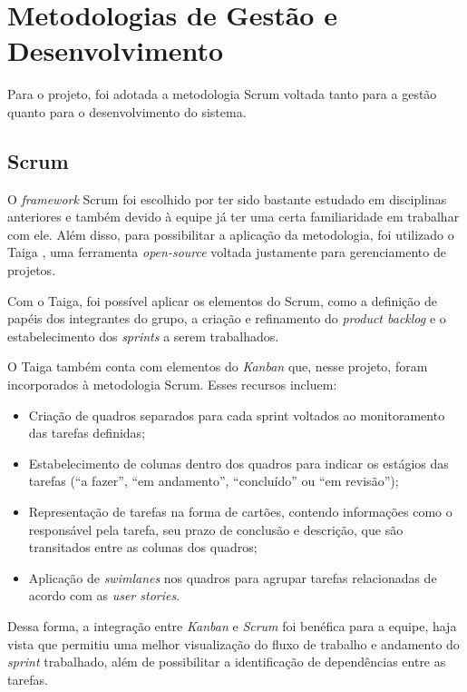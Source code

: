 \section{Metodologias de Gestão e Desenvolvimento}

\label{section:metolodogia-gestao}

Para o projeto, foi adotada a metodologia Scrum \cite{scrum-2024} voltada tanto para a gestão quanto para o desenvolvimento do sistema.

\subsection{Scrum}

O \textit{framework} Scrum foi escolhido por ter sido bastante estudado em disciplinas anteriores e também devido à equipe já ter uma certa familiaridade em trabalhar com ele. Além disso, para possibilitar a aplicação da metodologia, foi utilizado o Taiga \cite{taiga-2025}, uma ferramenta \textit{open-source} voltada justamente para gerenciamento de projetos.

Com o Taiga, foi possível aplicar os elementos do Scrum, como a definição de papéis dos integrantes do grupo, a criação e refinamento do \textit{product backlog} e o estabelecimento dos \textit{sprints} a serem trabalhados.

O Taiga também conta com elementos do \emph{Kanban} \cite{kanban-2023} que, nesse projeto, foram incorporados à metodologia Scrum. Esses recursos incluem:

\begin{itemize}
	\item Criação de quadros separados para cada sprint voltados ao monitoramento das tarefas definidas;
	\item Estabelecimento de colunas dentro dos quadros para indicar os estágios das tarefas (“a fazer”, “em andamento”, “concluído” ou “em revisão”);
	\item Representação de tarefas na forma de cartões, contendo informações como o responsável pela tarefa, seu prazo de conclusão e descrição, que são transitados entre as colunas dos quadros;
	\item Aplicação de \textit{swimlanes} nos quadros para agrupar tarefas relacionadas de acordo com as \textit{user stories}.
\end{itemize}

Dessa forma, a integração entre \emph{Kanban} e \emph{Scrum} foi benéfica para a equipe, haja vista que permitiu uma melhor visualização do fluxo de trabalho e andamento do \textit{sprint} trabalhado, além de possibilitar a identificação de dependências entre as tarefas.

